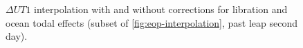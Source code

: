 \begin{figure}[h]
  \centering
  
  \caption{$\Delta UT1$ interpolation with and without corrections for libration and ocean todal effects (subset of \autoref{fig:eop-interpolation}, past leap second day).}
  \label{fig:eop-interpolation-dut1}
\end{figure}

\begin{minipage}{\linewidth}
  
\end{minipage}
